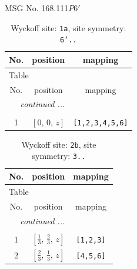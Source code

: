 \documentclass[fleqn,8pt]{jsarticle}
\begin{document}
\setcounter{MaxMatrixCols}{32}

\renewcommand{\tablename}{Table~}
\renewcommand{\figurename}{Figure~}
\begin{center}
\LARGE
MSG No. 168.111\quad$P6'$
\end{center}
\renewcommand{\arraystretch}{1.2}
\begin{longtable}{ccc}
\caption{Wyckoff site: {\tt 1a}, site symmetry: {\tt 6'..}}
 \\
 \hline \hline
No. & position & mapping \\ \hline \endfirsthead

\multicolumn{2}{l}{\tablename\ \thetable{}} \\
 \hline \hline
No. & position & mapping \\ \hline \endhead

 \hline \hline
\multicolumn{2}{r}{\footnotesize\it continued ...} \\ \endfoot

 \hline \hline
\multicolumn{2}{r}{} \\ \endlastfoot

1 & $\left[ 0,\, 0,\, z \right]$ & {\tt [1,2,3,4,5,6]} \\
\end{longtable}
\renewcommand{\arraystretch}{1.2}
\begin{longtable}{ccc}
\caption{Wyckoff site: {\tt 2b}, site symmetry: {\tt 3..}}
 \\
 \hline \hline
No. & position & mapping \\ \hline \endfirsthead

\multicolumn{2}{l}{\tablename\ \thetable{}} \\
 \hline \hline
No. & position & mapping \\ \hline \endhead

 \hline \hline
\multicolumn{2}{r}{\footnotesize\it continued ...} \\ \endfoot

 \hline \hline
\multicolumn{2}{r}{} \\ \endlastfoot

1 & $\left[ \frac{1}{3},\, \frac{2}{3},\, z \right]$ & {\tt [1,2,3]} \\ \hline
2 & $\left[ \frac{2}{3},\, \frac{1}{3},\, z \right]$ & {\tt [4,5,6]} \\
\end{longtable}
\renewcommand{\arraystretch}{1.2}
\end{document}
